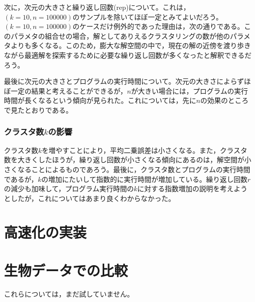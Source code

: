 \documentclass[10pt,a4,uplatex]{jsarticle}
\begin{document}
次に，次元の大きさと繰り返し回数(rep)について。これは，$(k = 10, n = 100000)$のサンプルを除いてほぼ一定とみてよいだろう。$(k = 10, n = 100000)$のケースだけ例外的であった理由は，次の通りである。このパラメタの組合せの場合，解としてありえるクラスタリングの数が他のパラメタよりも多くなる。このため，膨大な解空間の中で，現在の解の近傍を渡り歩きながら最適解を探索するために必要な繰り返し回数が多くなったと解釈できるだろう。

最後に次元の大きさとプログラムの実行時間について。次元の大きさによらずほぼ一定の結果と考えることができるが，$n$が大きい場合には，プログラムの実行時間が長くなるという傾向が見られた。これについては，先に$n$の効果のところで見たとおりである。

\subsubsection{クラスタ数$k$の影響}
クラスタ数$k$を増やすことにより，平均二乗誤差は小さくなる。また，クラスタ数を大きくしたほうが，繰り返し回数が小さくなる傾向にあるのは，解空間が小さくなることによるものであろう。最後に，クラスタ数とプログラムの実行時間であるが，$k$の増加にたいして指数的に実行時間が増加している。繰り返し回数$r$の減少も加味して，プログラム実行時間の$k$に対する指数増加の説明を考えようとしたが，これについてはあまり良くわからなかった。

\section{高速化の実装}
\section{生物データでの比較}
これらについては，まだ試していません。

\end{document}
